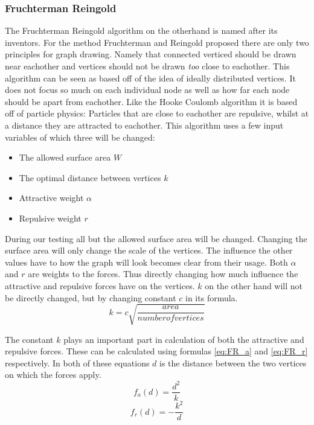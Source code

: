 \documentclass[a4paper,12pt]{article}
\begin{document}
    \subsubsection{Fruchterman Reingold}
    The Fruchterman Reingold algorithm on the otherhand is named after its inventors.\cite{fruchterman1991graph}
    For the method Fruchterman and Reingold proposed there are only two principles for graph drawing.
    Namely that connected verticed should be drawn near eachother and vertices should not be drawn \emph{too} close to eachother.
    This algorithm can be seen as based off of the idea of ideally distributed vertices.
    It does not focus so much on each individual node as well as how far each node should be apart from eachother.
    Like the Hooke Coulomb algorithm it is based off of particle physics:
    Particles that are close to eachother are repulsive, whilst at a distance they are attracted to eachother.
    This algorithm uses a few input variables of which three will be changed:
    \begin{itemize}
      \item The allowed surface area $W$
      \item The optimal distance between vertices $k$
      \item Attractive weight $\alpha$
      \item Repulsive weight $r$
    \end{itemize}
    During our testing all but the allowed surface area will be changed.
    Changing the surface area will only change the scale of the vertices.
    The influence the other values have to how the graph will look becomes clear from their usage.
    Both $\alpha$ and $r$ are weights to the forces.
    Thus directly changing how much influence the attractive and repulsive forces have on the vertices.
    $k$ on the other hand will not be directly changed, but by changing constant $c$ in its formula.
    \begin{equation}\label{eq:FR_k}
      k = c \sqrt{\frac{area}{number of vertices}}
    \end{equation}

    The constant $k$ plays an important part in calculation of both the attractive and repulsive forces.
    These can be calculated using formulas \ref{eq:FR_a} and \ref{eq:FR_r} respectively.
    In both of these equations $d$ is the distance between the two vertices on which the forces apply.
    \begin{equation}\label{eq:FR_a}
      f_a(d) = \frac{d^2}{k}
    \end{equation}
    \begin{equation}\label{eq:FR_r}
      f_r(d) = -\frac{k^2}{d}
    \end{equation}
\end{document}
